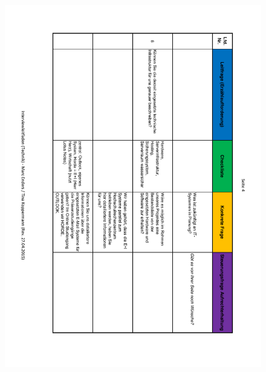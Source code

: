\begin{figure}
	\centering
	\includegraphics[width=18cm]{kapitel/anhang/Interviewleitfaden_4}
\end{figure}

